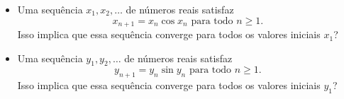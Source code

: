 \begin{itemize}
\item[(a)] Uma sequência \(x_1,x_2,\dots\) de números reais satisfaz
\[x_{n+1}=x_n \cos x_n \textrm{ para todo } n\geq 1.\]
Isso implica que essa sequência converge para todos os valores iniciais \(x_1\)?

\item[(b)] Uma sequência \(y_1,y_2,\dots\) de números reais satisfaz
\[y_{n+1}=y_n \sin y_n \textrm{ para todo } n\geq 1.\]
Isso implica que essa sequência converge para todos os valores iniciais \(y_1\)?
\end{itemize}

